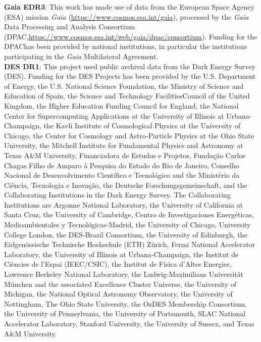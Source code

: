 \documentclass[fleqn,usenatbib]{mnras}
\begin{document}
{\bf Gaia EDR3}: This work has made use of data from the European Space Agency (ESA) mission {\it Gaia} (\url{https://www.cosmos.esa.int/gaia}), processed by the {\it Gaia} Data Processing and Analysis Consortium (DPAC,\url{https://www.cosmos.esa.int/web/gaia/dpac/consortium}). Funding for the DPAChas been provided by national institutions, in particular the institutions participating in the {\it Gaia} Multilateral Agreement.\\
{\bf DES DR1}: This project used public archival data from the Dark Energy Survey (DES). Funding for the DES Projects has been provided by the U.S. Department of Energy, the U.S. National Science Foundation, the Ministry of Science and Education of Spain, the Science and Technology FacilitiesCouncil of the United Kingdom, the Higher Education Funding Council for England, the National Center for Supercomputing Applications at the University of Illinois at Urbana-Champaign, the Kavli Institute of Cosmological Physics at the University of Chicago, the Center for Cosmology and Astro-Particle Physics at the Ohio State University, the Mitchell Institute for Fundamental Physics and Astronomy at Texas A\&M University, Financiadora de Estudos e Projetos, Funda{\c c}{\~a}o Carlos Chagas Filho de Amparo {\`a} Pesquisa do Estado do Rio de Janeiro, Conselho Nacional de Desenvolvimento Cient{\'i}fico e Tecnol{\'o}gico and the Minist{\'e}rio da Ci{\^e}ncia, Tecnologia e Inova{\c c}{\~a}o, the Deutsche Forschungsgemeinschaft, and the Collaborating Institutions in the Dark Energy Survey.
The Collaborating Institutions are Argonne National Laboratory, the University of California at Santa Cruz, the University of Cambridge, Centro de Investigaciones Energ{\'e}ticas, Medioambientales y Tecnol{\'o}gicas-Madrid, the University of Chicago, University College London, the DES-Brazil Consortium, the University of Edinburgh, the Eidgen{\"o}ssische Technische Hochschule (ETH) Z{\"u}rich,  Fermi National Accelerator Laboratory, the University of Illinois at Urbana-Champaign, the Institut de Ci{\`e}ncies de l'Espai (IEEC/CSIC), the Institut de F{\'i}sica d'Altes Energies, Lawrence Berkeley National Laboratory, the Ludwig-Maximilians Universit{\"a}t M{\"u}nchen and the associated Excellence Cluster Universe, the University of Michigan, the National Optical Astronomy Observatory, the University of Nottingham, The Ohio State University, the OzDES Membership Consortium, the University of Pennsylvania, the University of Portsmouth, SLAC National Accelerator Laboratory, Stanford University, the University of Sussex, and Texas A\&M University.
\end{document}
